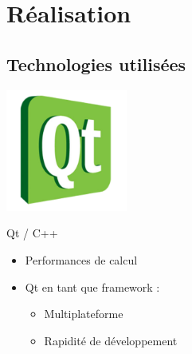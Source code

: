 \documentclass{beamer}
\begin{document}

\section{Réalisation}

\subsection{Technologies utilisées}

\begin{frame}

  \begin{center}
    \includegraphics[width=0.3\textwidth]{img/qt-logo.png}
  \end{center}

  \begin{block}{Qt / C++}
    \begin{itemize}
    \item Performances de calcul
    \item Qt en tant que framework : 
      \begin{itemize}
      \item Multiplateforme
      \item Rapidité de développement
      \end{itemize}
    \end{itemize}
  \end{block}
\end{frame}
\end{document}
